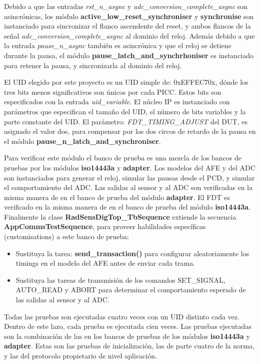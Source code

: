 \documentclass[a4paper, twoside, 11pt]{report}
\begin{document}
Debido a que las entradas \textit{rst\_n\_async} y \textit{adc\_conversion\_complete\_async} son asincrónicas, los módulo \textbf{active\_low\_reset\_synchroniser} y \textbf{synchronise} son instanciado para sincronizar el flanco ascendente del reset, y ambos flancos de la señal \textit{adc\_conversion\_complete\_async} al dominio del reloj. Además debido a que la entrada \textit{pause\_n\_async} también es asincrónica y que el reloj se detiene durante la pausa, el módulo \textbf{pause\_latch\_and\_synchrhoniser} es instanciado para retener la pausa, y sincronizarla al dominio del reloj.

El UID elegido por este proyecto es un UID simple de: 0xEFFEC70x, dónde los tres bits menos significativos son únicos por cada PICC. Estos bits son especificados con la entrada \textit{uid\_variable}. El núcleo IP es instanciado con parámetros que especifican el tamaño del UID, el número de bits variables y la parte constante del UID. El parámetro: \textit{FDT\_TIMING\_ADJUST} del DUT, es asignado el valor dos, para compensar por los dos circos de retardo de la pausa en el módulo \textbf{pause\_n\_latch\_and\_synchroniser}.

Para verificar este módulo el banco de prueba es una mezcla de los bancos de pruebas por los módulos \textbf{iso14443a} y \textbf{adapter}. Los modelos del AFE y del ADC son instanciados para generar el reloj, simular las pausas desde el PCD, y simular el comportamiento del ADC. Las salidas al sensor y al ADC son verificadas en la misma manera de en el banco de prueba del módulo \textbf{adapter}. El FDT es verificado en la misma manera de en el banco de prueba del módulo \textbf{iso14443a}. Finalmente la clase \textbf{RadSensDigTop\_TbSequence} extiende la secuencia \textbf{AppCommsTestSequence}, para proveer habilidades específicas (customisations) a este banco de prueba:

\begin{itemize}
  \item Sustituya la tarea: \textbf{send\_transaction()} para configurar aleatoriamente los timings en el modelo del AFE antes de enviar cada trama.
  \item Sustituya las tareas de transmisión de los comandos SET\_SIGNAL, AUTO\_READ y ABORT para determinar el comportamiento esperado de las salidas al sensor y al ADC.
\end{itemize}

Todas las pruebas son ejecutadas cuatro veces con un UID distinto cada vez. Dentro de este lazo, cada prueba es ejecutada cien veces. Las pruebas ejecutadas son la combinación de las en los bancos de pruebas de los módulos \textbf{iso14443a} y \textbf{adapter}. Estas son las pruebas de inicialización, las de parte cuatro de la norma, y las del protocolo propietario de nivel aplicación.
\end{document}
